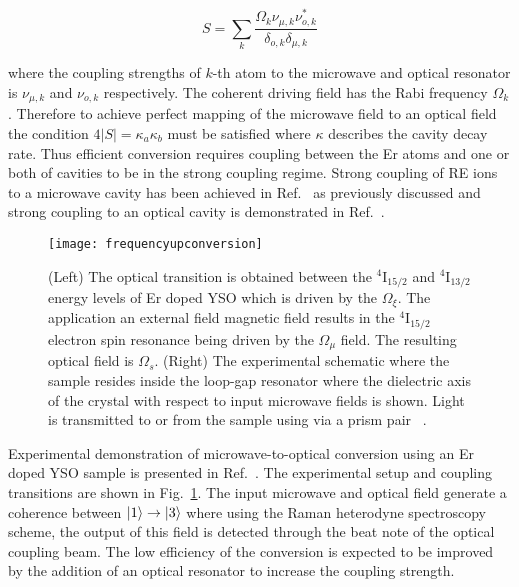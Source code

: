 \begin{equation}
\label{eq:qubit}
S = \sum_{k} \frac{\Omega_{k}\nu_{\mu,k} \nu^{*}_{o,k}}{\delta_{o,k}\delta_{\mu,k}}
\end{equation}

where the coupling strengths of $k$-th atom to the microwave and optical resonator is $\nu_{\mu,k}$ and $\nu_{o,k}$ respectively. The coherent driving field has the Rabi frequency $\Omega_{k}$. Therefore to achieve perfect mapping of the microwave field to an optical field the condition $4\left | S \right | = \kappa_{a}\kappa_{b}$ must be satisfied where $\kappa$ describes the cavity decay rate. Thus efficient conversion requires coupling between the Er atoms and one or both of cavities to be in the strong coupling regime. Strong coupling of RE ions to a microwave cavity has been achieved in Ref.~\citep{PhysRevLett.110.157001} as previously discussed and strong coupling to an optical cavity is demonstrated in Ref.~\citep{PhysRevA.74.033818}.      

\begin{figure}[h]
\centering
\texttt{[image: frequencyupconversion]}
\caption{\label{fig:frequencyupconversion} (Left) The optical transition is obtained between the $^{4}$I$_{15/2}$ and $^{4}$I$_{13/2}$ energy levels of Er doped YSO which is driven by the $\Omega_{\xi}$. The application an external field magnetic field results in the $^{4}$I$_{15/2}$ electron spin resonance being driven by the $\Omega_{\mu}$ field. The resulting optical field is $\Omega_{s}$. (Right) The experimental schematic where the sample resides inside the loop-gap resonator where the dielectric axis of the crystal with respect to input microwave fields is shown. Light is transmitted to or from the sample using via a prism pair ~\citep{PhysRevA.92.062313}.}
\end{figure}

Experimental demonstration of microwave-to-optical conversion using an Er doped YSO sample is presented in Ref.~\citep{PhysRevA.92.062313}. The experimental setup and coupling transitions are shown in Fig.~\ref{fig:frequencyupconversion}. The input microwave and optical field generate a coherence between $\lvert1\rangle \rightarrow \lvert3\rangle$ where using the Raman heterodyne spectroscopy scheme, the output of this field is detected through the beat note of the optical coupling beam. The low efficiency of the conversion is expected to be improved by the addition of an optical resonator to increase the coupling strength.  

